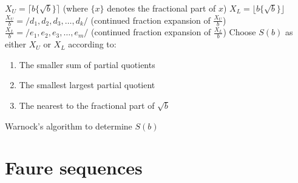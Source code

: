 \begin{algorithm}[h!]
\begin{algorithmic}
\STATE $X_U = \lceil b\{\sqrt{b}\} \rceil$ (where $\{x\}$ denotes the fractional part of $x$)
\STATE $X_L = \lfloor b\{\sqrt{b}\} \rfloor$
\STATE $\frac{X_U}{b} = /d_1, d_2, d_3, \ldots, d_k/$ (continued fraction expansion of $\frac{X_U}{b}$)
\STATE $\frac{X_L}{b} = /e_1, e_2, e_3, \ldots, e_m/$ (continued fraction expansion of $\frac{X_L}{b}$)
\STATE Choose $S(b)$ as either $X_U$ or $X_L$ according to:
\begin{enumerate}
\item The smaller sum of partial quotients
\item The smallest largest partial quotient
\item The nearest to the fractional part of $\sqrt{b}$
\end{enumerate}
\end{algorithmic}
\caption{Warnock's algorithm to determine $S(b)$}
\label{alg:warnock_s_b_search}
\end{algorithm}

\section{Faure sequences}

